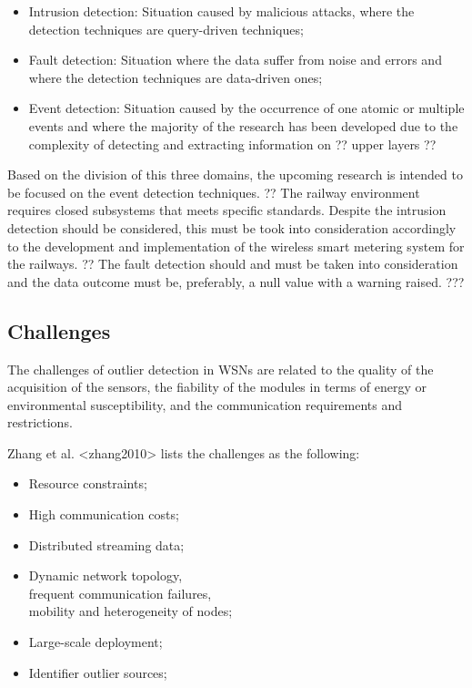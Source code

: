 \begin{itemize}
	\item Intrusion detection: Situation caused by malicious attacks, where the detection techniques are query-driven techniques;
	
	\item Fault detection: Situation where the data suffer from noise and errors and where the detection techniques are data-driven ones;
	
	\item Event detection: Situation caused by the occurrence of one atomic or multiple events and where the majority of the research has been developed due to the complexity of detecting and extracting information on ?? upper layers ??
\end{itemize}

Based on the division of this three domains, the upcoming research is intended to be focused on the event detection techniques. ?? The railway environment requires closed subsystems that meets specific standards. Despite the intrusion detection should be considered, this must be took into consideration accordingly to the development and implementation of the wireless smart metering system for the railways. ?? The fault detection should and must be taken into consideration and the data outcome must be, preferably, a null value with a warning raised. ???

\subsection{Challenges}

The challenges of outlier detection in WSNs are related to the quality of the acquisition of the sensors, the fiability of the modules in terms of energy or environmental susceptibility, and the communication requirements and restrictions.

Zhang et al. <zhang2010> lists the challenges as the following:

\begin{itemize}
	\setlength\itemsep{-0.5em}
	
	\item Resource constraints;
	
	\item High communication costs;
	
	\item Distributed streaming data;
	
	\item Dynamic network topology, \\ frequent communication failures, \\ mobility and heterogeneity of nodes;
	
	\item Large-scale deployment;
	
	\item Identifier outlier sources;
	
\end{itemize}

